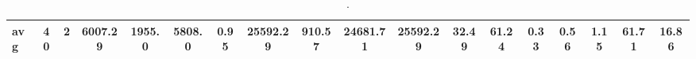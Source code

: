 \begin{sidewaystable}[h]
{\begin{tabular}{lccccccccccccccccc}
\cline{1-18} \textbf{avg} & \textbf{40} & \textbf{2} & \textbf{6007.29} & \textbf{1955.0} & \textbf{5808.0} & \textbf{0.95} & \textbf{25592.29} & \textbf{910.57} & \textbf{24681.71} & \textbf{25592.29} & \textbf{32.49} & \textbf{61.24} & \textbf{0.33} & \textbf{0.56} & \textbf{1.15} & \textbf{61.71} & \textbf{16.86} \\ \cline{1-18}
\bottomrule
\end{tabular}%
}%
\caption{.}
\label{tab:table_bc}
\end{sidewaystable}

